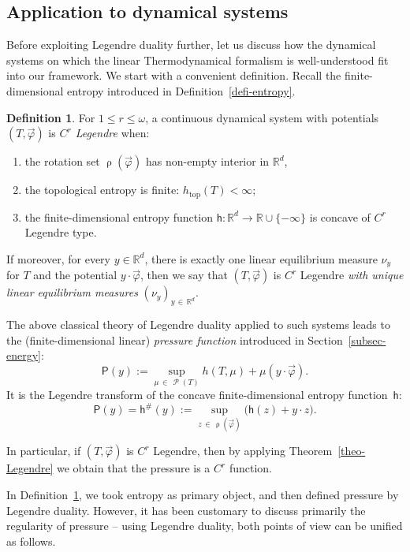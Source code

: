 \documentclass[10pt]{amsart}
\theoremstyle{definition}\newtheorem{defi}[theo]{Definition}\newtheorem{rema}[theo]{Remark}\newtheorem{exam}[theo]{Example}\newtheorem{exem}[theo]{Example}\newtheorem{nota}[theo]{Notation}
\theoremstyle{plain}
\theoremstyle{plain}
\renewcommand\top{{\mathrm{top}}}
\newcommand\vpot{\vec\pot}
\newcommand\Prob{{\operatorname{\mathscr{P}}}}
\newcommand{\rs}{\operatorname{\rho}}
\newcommand{\hf}{\mathsf{h}}
\newcommand{\Pf}{\mathsf{P}}
\newcommand{\pot}{\varphi}
\newcounter{In}
\newcommand*\8{\infty}
\newcommand\RR{\mathbb{R}}
\begin{document}
\subsection{Application to dynamical systems}

Before exploiting Legendre duality further, let us discuss how the dynamical systems on which the linear Thermodynamical formalism is well-understood fit into our framework. We start with a convenient definition. Recall the finite-dimensional entropy introduced in Definition~\ref{defi-entropy}.


\begin{defi}\label{defi-regular}
For $1\leq r\leq\omega$, a continuous dynamical system with potentials $(T,\vpot)$ is \emph{$C^r$ Legendre} when:
\begin{enumerate}
\item\label{item-interior}
the rotation set $\rs(\vpot)$ has non-empty interior in $\RR^d$,
\item the topological entropy is finite: $h_\top(T)<\infty$;
\item the finite-dimensional entropy function $\hf:\RR^d\to\RR\cup\{-\infty\}$ is concave of $C^r$ Legendre type.
\end{enumerate}

If moreover, for every $ y\in\RR^d$, there is exactly one linear equilibrium measure $\nu_{ y}$ for $T$ and the potential $ y\cdot\vpot$, then we say that $(T,\vpot)$ is $C^r$ Legendre \emph{with unique linear equilibrium measures} $(\nu_{ y})_{ y\,\in\,\RR^d}$.
\end{defi}

The above classical theory of Legendre duality {applied} to such systems leads to the (finite-dimensional linear) \emph{pressure function} introduced in Section~\ref{subsec-energy}:
\[
\Pf(y) := \sup_{\mu\,\in\,\Prob(T)} h(T,\mu)+ \mu(y\cdot \vpot).
\]
It is the Legendre transform of the concave finite-dimensional entropy function~$\hf$:
\[
\Pf(y) = \hf^\#(y) := \sup_{z\,\in\,\rs(\vpot)} \big(\hf(z) + y \cdot z \big).
\]

In particular, if $(T,\vpot)$ is $C^r$ Legendre, then by applying Theorem~\ref{theo-Legendre} we obtain that the pressure is a $C^r$ function.

In Definition~\ref{defi-regular}, we took entropy as primary object, and then defined pressure by Legendre duality. However, it has been customary to discuss primarily the regularity of pressure -- using Legendre duality, both points of view can be unified as follows.
\end{document}
